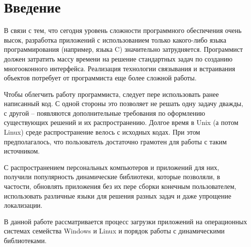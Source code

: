 \newpage
\section*{Введение}

В связи с тем, что сегодня уровень сложности программного обеспечения очень высок, разработка приложений с использованием только какого-либо языка программирования (например, языка C) значительно затрудняется. Программист должен затратить массу времени на решение стандартных задач по созданию многооконного интерфейса. Реализация технологии связывания и встраивания объектов потребует от программиста еще более сложной работы.

Чтобы облегчить работу программиста, следует пере использовать ранее написанный код. С одной стороны это позволяет не решать одну задачу дважды, с другой -- появляются дополнительные требования по оформлению существующих решений и их распространению. Долгое время в Unix (а потом Linux) среде распространение велось с исходных кодах. При этом предполагалось, что пользователь достаточно грамотен для работы с таким источником.

С распространением персональных компьютеров и приложений для них, получили популярность динамические библиотеки, которые позволяли, в частости, обновлять приложения без их пере сборки конечным пользователем, использовать различные языки для решения разных задач и даже упрощение локализации.

В данной работе рассматривается процесс загрузки приложений на операционных системах семейства Windows и Linux и порядок работы с динамическими библиотеками.